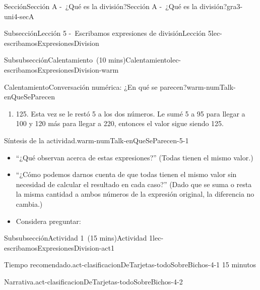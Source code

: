 \documentclass[oneside,10pt,]{article}
\newlength{\fillinmaxwidth}
\newlength{\fillincontract}
\newlength{\charmaxwidth}\setlength{\charmaxwidth}{0.5em}
\newlength{\charminwidth}\setlength{\charminwidth}{0.1em}
\newlength{\fillinheight}
\newcommand{\fillintext}[1]{%
\setlength{\fillinmaxwidth}{#1\charmaxwidth}%
\setlength{\fillincontract}{#1\charminwidth}%
\setlength{\fillinheight}{\baselineskip}\addtolength{\fillinheight}{1.2pt}%
\strut\nobreak\leaders\vbox{\hrule width 0.3pt height 0.3pt \vskip -1.2pt}\hskip 1\fillinmaxwidth minus \fillincontract\nobreak\strut%
}
\begin{document}
\begin{sectionptx}{Sección}{Sección A -~¿Qué es la división?}{}{Sección A -~¿Qué es la división?}{}{}{gra3-uni4-secA}
\begin{subsectionptx}{Subsección}{Lección 5 -~Escribamos expresiones de división}{}{Lección 5}{}{}{lec-escribamosExpresionesDivision}
\begin{subsubsectionptx}{Subsubsección}{Calentamiento~(10 mins)}{}{Calentamiento}{}{}{lec-escribamosExpresionesDivision-warm}
\begin{exploration}{Calentamiento}{Conversación numérica: ¿En qué se parecen?}{warm-numTalk-enQueSeParecen}
\begin{enumerate}[label={\Alph*.}]
\item{}125. Esta vez se le restó 5 a los dos números. Le sumé 5 a 95 para llegar a 100 y 120 más para llegar a 220, entonces el valor sigue siendo 125.%
\end{enumerate}
%
\end{exploration}%
\par
\begin{paragraphs}{Síntesis de la actividad.}{warm-numTalk-enQueSeParecen-5-1}%
%
\begin{itemize}[label=\textbullet]
\item{}``¿Qué observan acerca de estas expresiones?'' (Todas tienen el mismo valor.)%
\item{}``¿Cómo podemos darnos cuenta de que todas tienen el mismo valor sin necesidad de calcular el resultado en cada caso?'' (Dado que se suma o resta la misma cantidad a ambos números de la expresión original, la diferencia no cambia.)%
\item{}Considera preguntar:%
%
\end{itemize}
\end{paragraphs}%
\end{subsubsectionptx}
%
%
\typeout{************************************************}
\typeout{************************************************}
%
\begin{subsubsectionptx}{Subsubsección}{Actividad 1~(15 mins)}{}{Actividad 1}{}{}{lec-escribamosExpresionesDivision-act1}
\par
\begin{paragraphs}{Tiempo recomendado.}{act-clasificacionDeTarjetas-todoSobreBichos-4-1}%
15 minutos%
\end{paragraphs}%
\begin{paragraphs}{Narrativa.}{act-clasificacionDeTarjetas-todoSobreBichos-4-2}%

\end{paragraphs}
\end{subsubsectionptx}
\end{subsectionptx}
\end{sectionptx}
\end{document}
